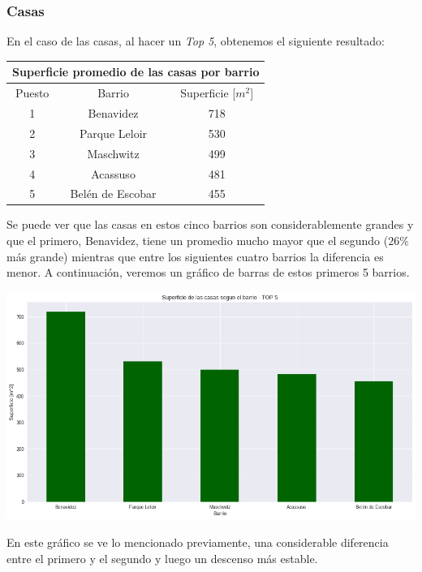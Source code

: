 \documentclass[a4paper, 10pt]{article}
\newcommand\tab[1][0.5cm]{\hspace*{#1}}
\begin{document}
				\subsubsection{Casas}
					En el caso de las casas, al hacer un \emph{Top 5}, obtenemos el siguiente resultado:
					\begin{center}
						\begin{tabular}{ |c|c|c| }
							\hline
							\multicolumn{3}{|c|}{Superficie promedio de las casas por barrio}\\
							\hline
							\hline
							Puesto & Barrio & Superficie [$m^2$]\\
							\hline
							1 & Benavidez & 718 \\
							2 & Parque Leloir & 530 \\
							3 & Maschwitz & 499 \\
							4 & Acassuso & 481 \\
							5 & Belén de Escobar & 455\\
							\hline
						\end{tabular}
					\end{center}
					\tab Se puede ver que las casas en estos cinco barrios son considerablemente grandes y que el primero, Benavidez,
					tiene un promedio mucho mayor que el segundo ($26\%$ más grande) mientras que entre los siguientes cuatro barrios
					la diferencia es menor. A continuación, veremos un gráfico de barras de estos primeros 5 barrios.
					\begin{center}
   		    				\includegraphics[width=\textwidth]{images/houseSurfaceTopBar}
				  	\end{center}
				  	\tab En este gráfico se ve lo mencionado previamente, una considerable diferencia entre el primero y el segundo
				  	y luego un descenso más estable. \\
\end{document}
